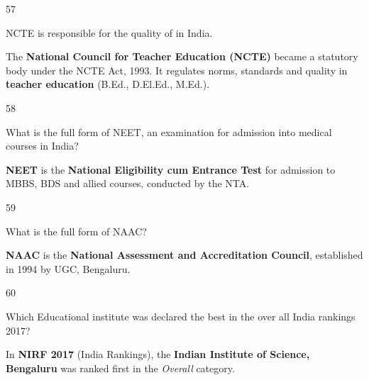 \begin{question}{57}
{NCTE is responsible for the quality of \blank{} in India.\par}
\begin{explain}
The \textbf{National Council for Teacher Education (NCTE)} became a statutory body under the NCTE Act, 1993. It regulates norms, standards and quality in \textbf{teacher education} (B.Ed., D.El.Ed., M.Ed.).
\end{explain}
\end{question}

\begin{question}{58}
{What is the full form of NEET, an examination for admission into medical courses in India?\par}
\begin{explain}
\textbf{NEET} is the \textbf{National Eligibility cum Entrance Test} for admission to MBBS, BDS and allied courses, conducted by the NTA.
\end{explain}
\end{question}

\begin{question}{59}
{What is the full form of NAAC?\par}
\begin{explain}
\textbf{NAAC} is the \textbf{National Assessment and Accreditation Council}, established in 1994 by UGC, Bengaluru.
\end{explain}
\end{question}

\begin{question}{60}
{Which Educational institute was declared the best in the over all India rankings 2017?\par}
\begin{explain}
In \textbf{NIRF 2017} (India Rankings), the \textbf{Indian Institute of Science, Bengaluru} was ranked first in the \emph{Overall} category.
\end{explain}
\end{question}
